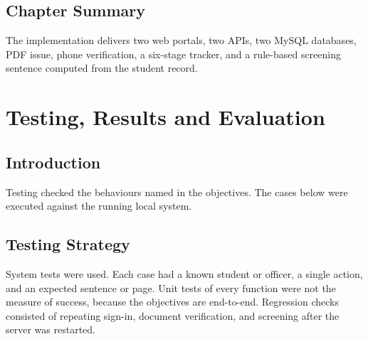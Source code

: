 \documentclass[12pt,a4paper]{report}
\begin{document}
\section{Chapter Summary}
The implementation delivers two web portals, two APIs, two MySQL databases, PDF issue, phone verification, a six-stage tracker, and a rule-based screening sentence computed from the student record.

\chapter{Testing, Results and Evaluation}

\section{Introduction}
Testing checked the behaviours named in the objectives. The cases below were executed against the running local system.

\section{Testing Strategy}
System tests were used. Each case had a known student or officer, a single action, and an expected sentence or page. Unit tests of every function were not the measure of success, because the objectives are end-to-end. Regression checks consisted of repeating sign-in, document verification, and screening after the server was restarted.
\end{document}
